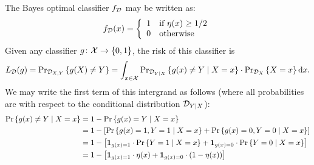 The Bayes optimal classifier $f_{\mathcal{D}}$ may be written as:
\[
    f_{\mathcal{D}} (x) = \left \{ \begin{array}{ll} 
                                1 & \text{if } \eta(x) \geq 1/2 \\
                                0 & \text{otherwise}
                         \end{array} \right .
\]
Given any classifier $g \colon \mathcal{X} \rightarrow \{0, 1\}$, the risk of this 
classifier is 
\begin{equation}
\label{ex3.7:loss}
    L_{\mathcal{D}} (g) = \text{Pr}_{\mathcal{D}_{X, Y}} \left \{ g(X) \neq Y \right \} = \int_{x \in \mathcal{X}} 
 \text{Pr}_{\mathcal{D}_{Y \mid X}} \left \{ g(x) \neq Y \mid X = x \right \} \cdot \text{Pr}_{\mathcal{D}_{X}} \left \{ X = x \right \} \text{d} x.
\end{equation}
We may write the first term of this intergrand as follows (where all probabilities 
are with respect to the conditional distribution $\mathcal{D}_{Y \mid X}$):
\begin{align*}
    \text{Pr} \left \{ g(x) \neq Y \mid X = x \right \} & =  1 - \text{Pr} \left \{ g(x) = Y \mid X = x \right \} \\
    & = 1 - \left [ \text{Pr} \left \{ g(x) = 1, Y = 1 \mid X = x \right \} + \text{Pr} \left \{ g(x) = 0, Y = 0 \mid X = x \right \} \right ] \\
    & = 1 - \left [ \mathbf{1}_{g(x) = 1} \cdot \text{Pr} \left \{ Y = 1 \mid X = x \right \}  + 
                  \mathbf{1}_{g(x) = 0} \cdot \text{Pr} \left \{ Y = 0 \mid X = x \right \} \right ] \\
    & = 1 - \left [ \mathbf{1}_{g(x) = 1} \cdot \eta (x)  + 
                  \mathbf{1}_{g(x) = 0} \cdot (1 - \eta (x)) \right ] \\
\end{align*}


